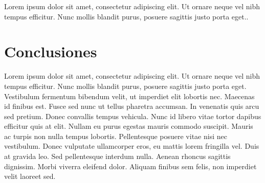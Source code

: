 \documentclass{mylib/reporteConCalif}
\begin{document}

Lorem ipsum dolor sit amet, consectetur adipiscing elit. Ut ornare neque vel nibh tempus efficitur. Nunc mollis blandit purus, posuere sagittis justo porta eget..\\


\section{Conclusiones}

Lorem ipsum dolor sit amet, consectetur adipiscing elit. Ut ornare neque vel nibh tempus efficitur. Nunc mollis blandit purus, posuere sagittis justo porta eget.\\

Vestibulum fermentum bibendum velit, ut imperdiet elit lobortis nec. Maecenas id finibus est. Fusce sed nunc ut tellus pharetra accumsan. In venenatis quis arcu sed pretium. Donec convallis tempus vehicula. Nunc id libero vitae tortor dapibus efficitur quis at elit. Nullam eu purus egestas mauris commodo suscipit. Mauris ac turpis non nulla tempus lobortis. Pellentesque posuere vitae nisi nec vestibulum. Donec vulputate ullamcorper eros, eu mattis lorem fringilla vel. Duis at gravida leo. Sed pellentesque interdum nulla. Aenean rhoncus sagittis dignissim. Morbi viverra eleifend dolor. Aliquam finibus sem felis, non imperdiet velit laoreet sed.
\end{document}

